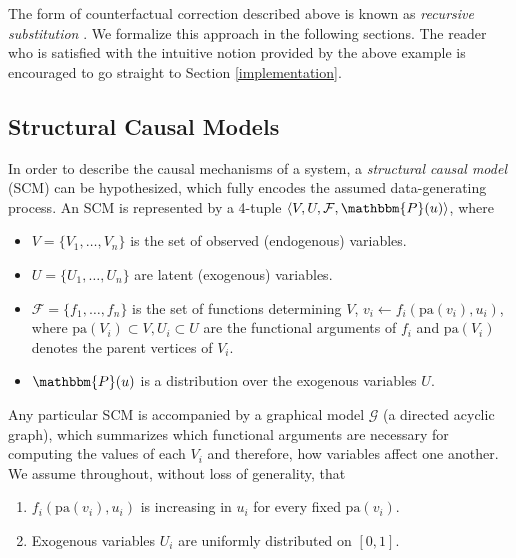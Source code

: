 \documentclass[
  nojss]{jss}
\providecommand{\tightlist}{%
  \setlength{\itemsep}{0pt}\setlength{\parskip}{0pt}}
\begin{document}
The form of counterfactual correction described above is known as
\emph{recursive substitution} \citep[Chapter~7]{pearl2009causality}. We
formalize this approach in the following sections. The reader who is
satisfied with the intuitive notion provided by the above example is
encouraged to go straight to Section \ref{implementation}.

\hypertarget{structural-causal-models}{%
\subsection{Structural Causal Models}\label{structural-causal-models}}

In order to describe the causal mechanisms of a system, a
\emph{structural causal model} (SCM) can be hypothesized, which fully
encodes the assumed data-generating process. An SCM is represented by a
4-tuple \(\langle V, U, \mathcal{F}, \mathbbm{P}(u) \rangle\), where

\begin{itemize}
\tightlist
\item
  \(V = \lbrace V_1, \ldots, V_n \rbrace\) is the set of observed
  (endogenous) variables.
\item
  \(U = \lbrace U_1, \ldots, U_n \rbrace\) are latent (exogenous)
  variables.
\item
  \(\mathcal{F} = \lbrace f_1, \ldots, f_n \rbrace\) is the set of
  functions determining \(V\), \(v_i \gets f_i(\mathrm{pa}(v_i), u_i)\),
  where \(\mathrm{pa}(V_i) \subset V, U_i \subset U\) are the functional
  arguments of \(f_i\) and \(\mathrm{pa}(V_i)\) denotes the parent
  vertices of \(V_i\).
\item
  \(\mathbbm{P}(u)\) is a distribution over the exogenous variables
  \(U\).
\end{itemize}

Any particular SCM is accompanied by a graphical model \(\mathcal{G}\)
(a directed acyclic graph), which summarizes which functional arguments
are necessary for computing the values of each \(V_i\) and therefore,
how variables affect one another. We assume throughout, without loss of
generality, that

\begin{enumerate}
\def\labelenumi{(\roman{enumi})}
\tightlist
\item
  \(f_i(\mathrm{pa}(v_i), u_i)\) is increasing in \(u_i\) for every
  fixed \(\mathrm{pa}(v_i)\).
\item
  Exogenous variables \(U_i\) are uniformly distributed on \([0, 1]\).
\end{enumerate}
\end{document}
